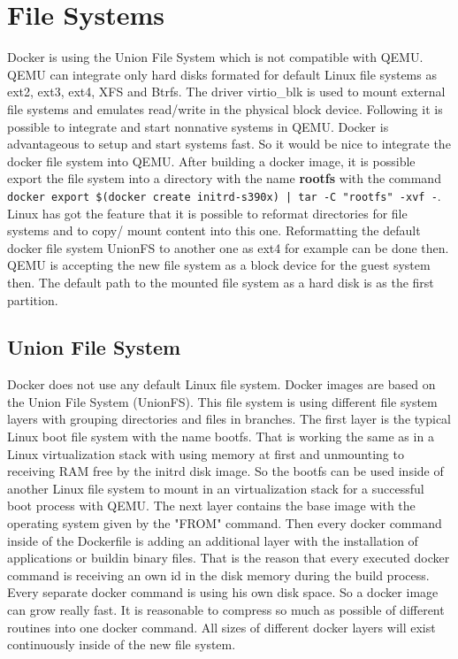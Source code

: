 \section{File Systems}

Docker is using the Union File System which is not compatible with QEMU.
QEMU can integrate only hard disks formated for default Linux file systems as ext2, ext3, ext4, XFS and Btrfs. 
The driver virtio\_blk is used to mount external file systems and emulates read/write in the physical block device\cite{Barboza2018}. Following it is possible to integrate and start nonnative systems in QEMU. 
Docker is advantageous to setup and start systems fast. 
So it would be nice to integrate the docker file system into QEMU. After building a docker image, it is possible export the file system into a directory with the name \textbf{rootfs} with the command \lstinline!docker export $(docker create initrd-s390x) | tar -C "rootfs" -xvf -!. \\

Linux has got the feature that it is possible to reformat directories for file systems and to copy/ mount content into this one. Reformatting the default docker file system UnionFS to another one as ext4 for example can be done then. \\
QEMU is accepting the new file system as a block device for the guest system then. The default path to the mounted file system as a hard disk is  as the first partition\cite[~p.22]{White2020}.

\subsection{Union File System}

Docker does not use any default Linux file system. 
Docker images are based on the Union File System (UnionFS)\cite[~p.21]{Ashraf2015}. 
This file system is using different file system layers with grouping directories and files in branches. 
The first layer is the typical Linux boot file system with the name bootfs. 
That is working the same as in a Linux virtualization stack with using memory at first and unmounting to receiving RAM free by the initrd disk image. 
So the bootfs can be used inside of another Linux file system to mount in an virtualization stack for a successful boot process with QEMU.
The next layer contains the base image with the operating system given by the "FROM" command.
Then every docker command inside of the Dockerfile is adding an additional layer with the installation of applications or buildin binary files.
That is the reason that every executed docker command is receiving an own id in the disk memory during the build process.
Every separate docker command is using his own disk space. So a docker image can grow really fast.
It is reasonable to compress so much as possible of different routines into one docker command. 
All sizes of different docker layers will exist continuously inside of the new file system.

